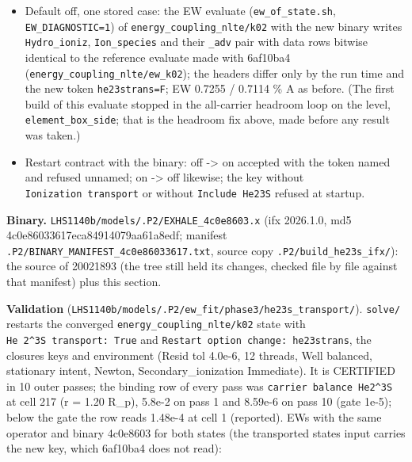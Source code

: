 \documentclass[english,a4paper]{my_memo}
\begin{document}
\begin{itemize}
  fixture re-made).
\item
  Default off, one stored case: the EW evaluate (\texttt{ew\_of\_state.sh},
  \texttt{EW\_DIAGNOSTIC=1}) of \texttt{energy\_coupling\_nlte/k02} with the new binary
  writes \texttt{Hydro\_ioniz}, \texttt{Ion\_species} and their \texttt{\_adv} pair with data rows
  bitwise identical to the reference evaluate made with 6af10ba4
  (\texttt{energy\_coupling\_nlte/ew\_k02}); the headers differ only by the run time
  and the new token \texttt{he23strans=F}; EW 0.7255 / 0.7114 \% A as before. (The
  first build of this evaluate stopped in the all-carrier headroom loop on
  the level, \texttt{element\_box\_side}; that is the headroom fix above, made
  before any result was taken.)
\item
  Restart contract with the binary: off -\textgreater{} on accepted with the token named
  and refused unnamed; on -\textgreater{} off likewise; the key without
  \texttt{Ionization\ transport} or without \texttt{Include\ He23S} refused at startup.
\end{itemize}

\textbf{Binary.} \texttt{LHS1140b/models/.P2/EXHALE\_4c0e8603.x} (ifx 2026.1.0, md5
4c0e86033617eca84914079aa61a8edf; manifest
\texttt{.P2/BINARY\_MANIFEST\_4c0e86033617.txt}, source copy \texttt{.P2/build\_he23s\_ifx/}):
the source of 20021893 (the tree still held its changes, checked file by
file against that manifest) plus this section.

\textbf{Validation} (\texttt{LHS1140b/models/.P2/ew\_fit/phase3/he23s\_transport/}).
\texttt{solve/} restarts the converged \texttt{energy\_coupling\_nlte/k02} state with
\texttt{He\ 2\^{}3S\ transport:\ True} and \texttt{Restart\ option\ change:\ he23strans}, the
closure\textquotesingle s keys and environment (Resid tol 4.0e-6, 12 threads, Well
balanced, stationary intent, Newton, Secondary\_ionization Immediate). It is
CERTIFIED in 10 outer passes; the binding row of every pass was
\texttt{carrier\ balance\ He2\^{}3S} at cell 217 (r = 1.20 R\_p), 5.8e-2 on pass 1 and
8.59e-6 on pass 10 (gate 1e-5); below the gate the row reads 1.48e-4 at
cell 1 (reported). EWs with the same operator and binary 4c0e8603 for both
states (the transported state\textquotesingle s input carries the new key, which 6af10ba4
does not read):
\end{document}
